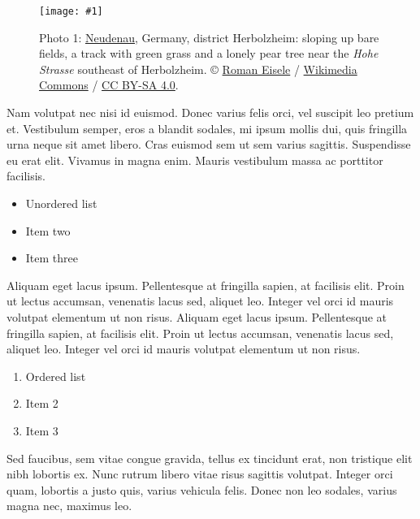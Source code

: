 \documentclass{article}
\newlength{\imgwidth}
\newcommand\scaledgraphics[2]{%
                
\settowidth{\imgwidth}{\texttt{[image: \#1]}}%
                
\setlength{\imgwidth}{\minof{\imgwidth}{#2\textwidth}}%
                
\texttt{[image: \#1]}%
                
}
\begin{document}
\begin{figure}
\scaledgraphics{9ca8919d-1362-44f1-9b69-1a9286cf1f45.jpeg}{1}
\caption*{Photo 1: \href{https://en.wikipedia.org/wiki/Neudenau}{Neudenau}, Germany, district Herbolzheim: sloping up bare fields, a track with green grass and a lonely pear tree near the \emph{Hohe Strasse} southeast of Herbolzheim. © \href{https://commons.wikimedia.org/wiki/User:Aristeas}{Roman Eisele} / \href{https://commons.wikimedia.org/wiki/Main_Page}{Wikimedia Commons} / \href{https://creativecommons.org/licenses/by-sa/4.0/}{CC BY-SA 4.0}.}\label{F6617821}
\end{figure}


Nam volutpat nec nisi id euismod. Donec varius felis orci, vel suscipit leo pretium et. Vestibulum semper, eros a blandit sodales, mi ipsum mollis dui, quis fringilla urna neque sit amet libero. Cras euismod sem ut sem varius sagittis. Suspendisse eu erat elit. Vivamus in magna enim. Mauris vestibulum massa ac porttitor facilisis.

\begin{itemize}
\item Unordered list


\item Item two


\item Item three


\end{itemize}

Aliquam eget lacus ipsum. Pellentesque at fringilla sapien, at facilisis elit. Proin ut lectus accumsan, venenatis lacus sed, aliquet leo. Integer vel orci id mauris volutpat elementum ut non risus. Aliquam eget lacus ipsum. Pellentesque at fringilla sapien, at facilisis elit. Proin ut lectus accumsan, venenatis lacus sed, aliquet leo. Integer vel orci id mauris volutpat elementum ut non risus. 

\begin{enumerate}
\item Ordered list


\item Item 2


\item Item 3


\end{enumerate}

Sed faucibus, sem vitae congue gravida, tellus ex tincidunt erat, non tristique elit nibh lobortis ex. Nunc rutrum libero vitae risus sagittis volutpat. Integer orci quam, lobortis a justo quis, varius vehicula felis. Donec non leo sodales, varius magna nec, maximus leo. 
\end{document}
